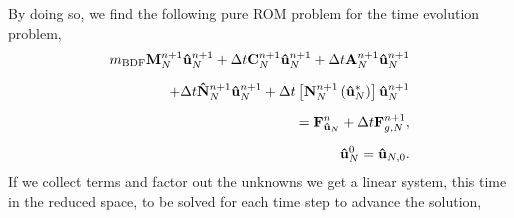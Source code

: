 \documentclass[../../thesis.tex]{subfiles}
\newcommand{\dt}{\ensuremath{\Delta t}}
\begin{document}
By doing so, we find the following pure ROM problem for the time evolution problem,
\begin{subequations}
    \label{eq:1d_rom_weak_formulation_discrete}
    \begin{align}
        m_{\text{BDF}} \vb{M}^{n+1}_{N} \vb{\hat{u}}_{N}^{n+1}
        + \dt \vb{C}^{n+1}_{N} \vb{\hat{u}}_{N}^{n+1}
        + \dt \vb{A}^{n+1}_{N} \vb{\hat{u}}_{N}^{n+1}
        \nonumber 
        \\[2mm]
        + \dt \vb{\hat{N}}^{n+1}_{N} \vb{\hat{u}}_{N}^{n+1}
        + \dt \left[\vb{N}^{n+1}_{N}\left(\vb{\hat{u}}_{N}^{*}\right)\right] \vb{\hat{u}}_{N}^{n+1}
        \nonumber
        \\[2mm]
        = \vb{F}_{\vb{\hat{u}}_{N}}^{n}
        + \dt \vb{F}_{g,N}^{n+1},
        \\[2mm]
        \vb{\hat{u}}_N^{0} = \vb{\hat{u}}_{N,0}.
    \end{align}
\end{subequations}
If we collect terms and factor out the unknowns we get a linear system, 
this time in the reduced space, to be solved for each time step to advance the solution,
\end{document}
